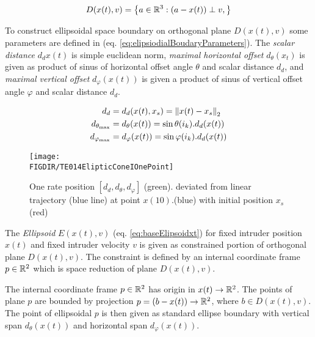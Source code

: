 \begin{equation}\label{eq:elisioidalOtrthogonalPlane}
    D({x}(t),{v})=\left\{{a}\in\mathbb{R}^3:({a}-{x}(t))\perp{v},\right\}
\end{equation}

\noindent To construct  ellipsoidal space boundary on orthogonal plane $D({x}(t),{v})$ some parameters are defined in (eq. \ref{eq:elipsiodialBoudaryParameters}). The \emph{scalar distance} $d_d{{x}(t)}$ is simple euclidean norm, \emph{maximal horizontal offset} $d_\theta({x}_t)$ is given as product of sinus of horizontal offset angle $\theta$ and scalar distance $d_d$, and \emph{maximal vertical offset} $d_\varphi({x}(t))$ is given a product of sinus of vertical offset angle $\varphi$ and scalar distance $d_d$.

\begin{equation}\label{eq:elipsiodialBoudaryParameters}
    \begin{aligned}
     d_d                      &=d_d({x}(t),{x}_s) =\left\lVert{x}(t)-{x}_s\right\rVert_2\\ 
     d_{\theta_{\text{max}}}  &= d_\theta({x}(t))=\sin\theta   (i_k).d_d({x}(t))\\
     d_{\varphi_{\text{max}}} &= d_\varphi({x}(t))=\sin\varphi (i_k).d_d({x}(t)) 
    \end{aligned}
\end{equation}

\begin{figure}[H]
    \centering
    \texttt{[image: \\FIGDIR/TE014ElipticConeIOnePoint]}         
    \caption{One rate position $[d_d,d_\theta,d_\varphi]$ (green). deviated from linear trajectory (blue line) at point ${x}(10)$.(blue) with initial position $x_s$ (red)}
    \label{fig:P21ElipticConeIOnePoint}
\end{figure}

\noindent The \emph{Ellipsoid} $E({x}(t),{v})$ (eq. \ref{eq:baseElipsoidxt}) for fixed intruder position ${x}(t)$ and fixed intruder velocity ${v}$ is given as constrained portion of orthogonal plane $D({x}(t),{v})$. The constraint is defined by an internal coordinate frame ${p}\in \mathbb{R}^2$ which is space reduction of plane $D({x}(t),{v})$. 

The internal coordinate frame ${p}\in\mathbb{R}^2$ has origin in ${x}(t)\to\mathbb{R}^2$. The points of plane ${p}$ are bounded by projection ${p}=({b}-{x}(t))\to\mathbb{R}^2$, where $b\in D({x}(t),v)$. The point of ellipsoidal ${p}$ is then given as standard ellipse boundary with vertical span $d_\theta({x}(t))$ and horizontal span $d_\varphi({x}(t))$. 

